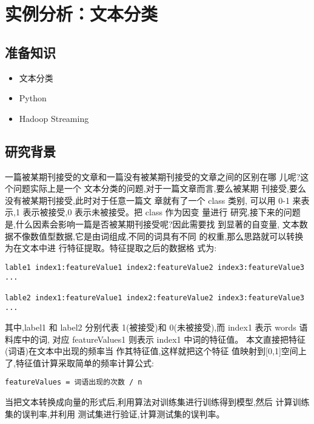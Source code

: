 \section{实例分析：文本分类}\label{ux5b9eux4f8bux5206ux6790ux6587ux672cux5206ux7c7b}

\subsection{准备知识}\label{ux51c6ux5907ux77e5ux8bc6}

\begin{itemize}
\itemsep1pt\parskip0pt
\item
  文本分类
\item
  Python
\item
  Hadoop Streaming
\end{itemize}

\subsection{研究背景}\label{ux7814ux7a76ux80ccux666f}

一篇被某期刊接受的文章和一篇没有被某期刊接受的文章之间的区别在哪
儿呢?这个问题实际上是一个 文本分类的问题,对于一篇文章而言,要么被某期
刊接受,要么没有被某期刊接受,此时对于任意一篇文 章就有了一个 class 类别,
可以用 0-1 来表示,1 表示被接受,0 表示未被接受。把 class 作为因变 量进行
研究,接下来的问题是,什么因素会影响一篇是否被某期刊接受呢?因此需要找
到显著的自变量, 文本数据不像数值型数据,它是由词组成,不同的词具有不同
的权重,那么思路就可以转换为在文本中进 行特征提取。特征提取之后的数据格
式为:

\begin{lstlisting}
lable1 index1:featureValue1 index2:featureValue2 index3:featureValue3 ...

lable2 index1:featureValue1 index2:featureValue2 index3:featureValue3 ...
\end{lstlisting}

其中,label1 和 label2 分别代表 1(被接受)和 0(未被接受),而 index1 表示
words 语料库中的词, 对应 featureValues1 则表示 index1 中词的特征值。
本文直接把特征(词语)在文本中出现的频率当 作其特征值,这样就把这个特征
值映射到{[}0,1{]}空间上了,特征值计算采取简单的频率计算公式:

\begin{lstlisting}
featureValues = 词语出现的次数 / n
\end{lstlisting}

当把文本转换成向量的形式后,利用算法对训练集进行训练得到模型,然后
计算训练集的误判率,并利用 测试集进行验证,计算测试集的误判率。

